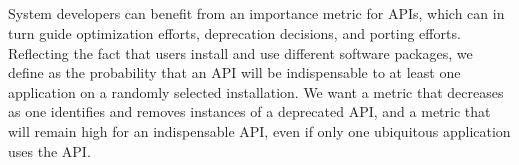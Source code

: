 \subsection{\UsageMetric{}}

System developers can benefit from an importance metric for APIs,
which can in turn guide optimization efforts, deprecation decisions,
and porting efforts.  
Reflecting the fact that users install and use different software packages,
we define
\usagemetric{} as the probability that
an API will be indispensable to 
 at least one application on a randomly selected 
installation.
We want a metric that decreases
as one identifies and removes instances
of a deprecated API,
and a metric that will remain high for an indispensable API, 
even if only one ubiquitous application uses the API.






